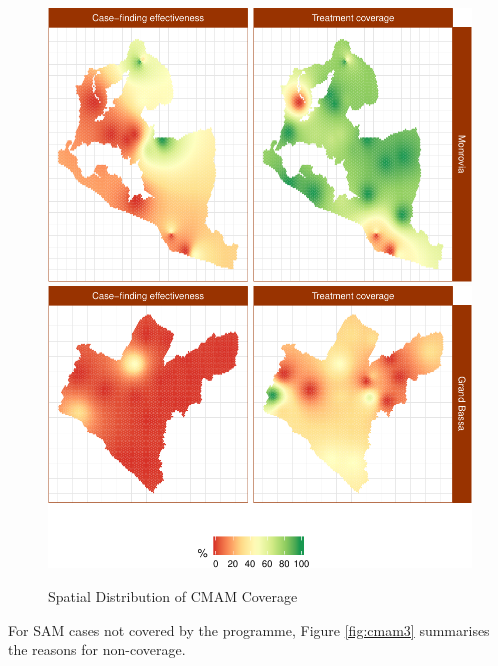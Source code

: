 \documentclass[12pt,a4paper]{article}
\theoremstyle{definition}
\theoremstyle{definition}
\theoremstyle{definition}
\theoremstyle{remark}
\begin{document}
\begin{figure}[H]

{\centering \includegraphics{liberiaCoverageReport_files/figure-latex/cmamMap-1} \includegraphics{liberiaCoverageReport_files/figure-latex/cmamMap-2} 

}

\caption{Spatial Distribution of CMAM Coverage}\label{fig:cmamMap}
\end{figure}

For SAM cases not covered by the programme, Figure \ref{fig:cmam3}
summarises the reasons for non-coverage.
\end{document}
